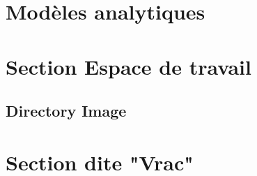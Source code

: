 \section{Mod\`eles analytiques}
\label{Model:Analytik}



\section{Section Espace de travail}

\subsection{Directory Image}
\label{DU:Dir:Images}

\section{Section dite "Vrac"}
